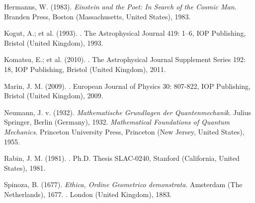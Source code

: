 \documentclass[10pt,a4paper,twoside,openany]{book}
\begin{document}
\begin{thebibliography}{99}
 Hermanns, W. (1983). \textit{Einstein and the Poet: In Search of the Cosmic Man}. Branden Press, Boston (Massachusetts, United States), 1983.

 Kogut, A.; et al. (1993). . The Astrophysical Journal 419: 1–6, IOP Publishing, Bristol (United Kingdom), 1993.

 Komatsu, E.; et al. (2010). . The Astrophysical Journal Supplement Series 192: 18, IOP Publishing, Bristol (United Kingdom), 2011.

 Marin, J. M. (2009). . European Journal of Physics 30: 807-822, IOP Publishing, Bristol (United Kingdom), 2009.

 Neumann, J. v. (1932). \textit{Mathematische Grundlagen der Quantenmechanik}. Julius Springer, Berlin (Germany), 1932. \textit{Mathematical Foundations of Quantum Mechanics}. Princeton University Press, Princeton (New Jersey, United States), 1955.

 Rabin, J. M. (1981). . Ph.D. Thesis SLAC-0240, Stanford (California, United States), 1981.

 Spinoza, B. (1677). \textit{Ethica, Ordine Geometrico demonstrata}. Amsterdam (The Netherlands), 1677. . London (United Kingdom), 1883.

\end{thebibliography}

\end{document}
